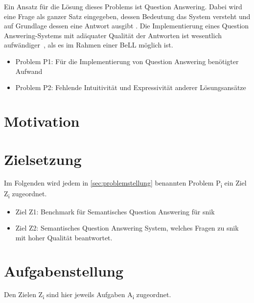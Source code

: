 Ein Ansatz für die Lösung dieses Problems ist Question Answering.
Dabei wird eine Frage als ganzer Satz eingegeben, dessen Bedeutung das System versteht und auf Grundlage dessen eine Antwort ausgibt \citep{qadefinition}.
Die Implementierung eines Question Answering-Systems mit adäquater Qualität der Antworten ist wesentlich aufwändiger~\citep[S.~3]{qanswer}, als es im Rahmen einer BeLL möglich ist.

\begin{itemize}
	\item Problem P1: Für die Implementierung von Question Answering benötigter Aufwand
	\item Problem P2: Fehlende Intuitivität und Expressivität anderer Lösungsansätze
\end{itemize}


\section{Motivation}


\section{Zielsetzung}\label{sec:zielsetzung}

Im Folgenden wird jedem in \cref{sec:problemstellung} benannten Problem P\textsubscript{i} ein Ziel Z\textsubscript{i} zugeordnet.

	\begin{itemize}
		\item Ziel Z1: Benchmark für Semantisches Question Answering für \acs{snik}
		\item Ziel Z2: Semantisches Question Answering System, welches Fragen zu \acs{snik} mit hoher Qualität beantwortet.
	\end{itemize}
\section{Aufgabenstellung}

Den Zielen Z\textsubscript{i} sind hier jeweils Aufgaben A\textsubscript{i} zugeordnet.

